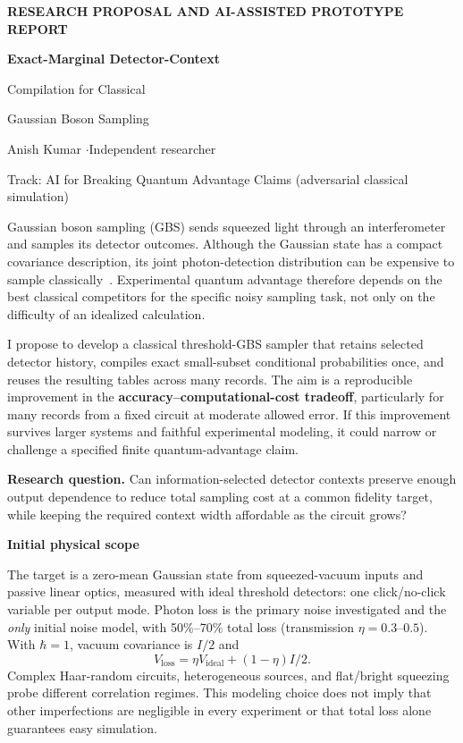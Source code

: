 \documentclass[11pt,letterpaper]{article}
\newcommand{\heading}[1]{\vspace{5pt}{\large\bfseries\color{ink}#1}\par\vspace{2pt}}
\newcommand{\subheading}[1]{{\bfseries\color{ink}#1}\par}
\newcommand{\panel}[1]{\par\vspace{2pt}\begingroup\setlength{\fboxsep}{8pt}\colorbox{pale}{\parbox{\dimexpr\linewidth-16pt\relax}{#1}}\endgroup\par\vspace{3pt}}
\begin{document}
\thispagestyle{fancy}
{\small\bfseries\color{accent}RESEARCH PROPOSAL AND AI-ASSISTED PROTOTYPE REPORT}\par
\vspace{4pt}
{\LARGE\bfseries\color{ink}Exact-Marginal Detector-Context\par
Compilation for Classical\par
Gaussian Boson Sampling}\par
\vspace{5pt}
{\small Anish Kumar \enspace$\cdot$\enspace Independent researcher\par
Track: AI for Breaking Quantum Advantage Claims (adversarial classical simulation)}

\heading{1. Project objective and significance}
Gaussian boson sampling (GBS) sends squeezed light through an interferometer and samples its detector outcomes. Although the Gaussian state has a compact covariance description, its joint photon-detection distribution can be expensive to sample classically~\cite{hamilton,quesada}. Experimental quantum advantage therefore depends on the best classical competitors for the specific noisy sampling task, not only on the difficulty of an idealized calculation.

I propose to develop a classical threshold-GBS sampler that retains selected detector history, compiles exact small-subset conditional probabilities once, and reuses the resulting tables across many records. The aim is a reproducible improvement in the \textbf{accuracy--computational-cost tradeoff}, particularly for many records from a fixed circuit at moderate allowed error. If this improvement survives larger systems and faithful experimental modeling, it could narrow or challenge a specified finite quantum-advantage claim.

\panel{\textbf{Research question.} Can information-selected detector contexts preserve enough output dependence to reduce total sampling cost at a common fidelity target, while keeping the required context width affordable as the circuit grows?}

\subheading{Initial physical scope}
The target is a zero-mean Gaussian state from squeezed-vacuum inputs and passive linear optics, measured with ideal threshold detectors: one click/no-click variable per output mode. Photon loss is the primary noise investigated and the \emph{only} initial noise model, with 50\%--70\% total loss (transmission $\eta=0.3$--$0.5$). With $\hbar=1$, vacuum covariance is $I/2$ and
\[
 V_{\mathrm{loss}}=\eta V_{\mathrm{ideal}}+(1-\eta)I/2.
\]
Complex Haar-random circuits, heterogeneous sources, and flat/bright squeezing probe different correlation regimes. This modeling choice does not imply that other imperfections are negligible in every experiment or that total loss alone guarantees easy simulation.
\end{document}
